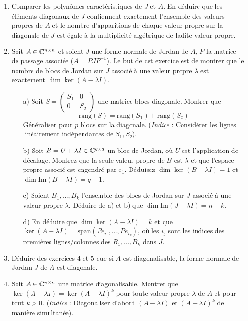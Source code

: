 \begin{enumerate}
\item Comparer les polynômes caractéristiques de $J$ et $A$. En déduire que les éléments diagonaux de $J$ contiennent exactement l'ensemble des valeurs propres de $A$ et le nombre d'apparitions de chaque valeur propre sur la diagonale de $J$ est égale à la multiplicité algébrique de ladite valeur propre.

\item Soit $A \in \Bbb C^{n \times n}$ et soient $J$ une forme normale de Jordan de $A$, $P$ la matrice de passage associée ($A = PJP^{-1}$). \newline 
Le but de cet exercice est de montrer que le nombre de blocs de Jordan sur $J$ associé à une valeur propre $\lambda$ est exactement $\dim \ker(A - \lambda I)$.
\begin{enumerate}

\item[a)] Soit $S = \begin{pmatrix} S_1 & 0 \\ 0 & S_2 \end{pmatrix}$ une matrice blocs diagonale. Montrer que $$\text{rang}(S) = \text{rang}(S_1) + \text{rang}(S_2)$$ 
Généraliser pour $p$ blocs sur la diagonale. (\textit{Indice} : Considérer les lignes linéairement indépendantes de $S_1, S_2$).
\item[b)] Soit $B = U + \lambda I \in \Bbb C^{q \times q}$ un bloc de Jordan, où $U$ est l'application de décalage. Montrez que la seule valeur propre de $B$ est $\lambda$ et que l'espace propre associé est engendré par $e_1$. Déduisez $\dim \ker (B - \lambda I) = 1$ et $\dim \text{Im} (B - \lambda I) = q-1$.
\item[c)] Soient $B_1, ..., B_k$ l'ensemble des blocs de Jordan sur $J$ associé à une valeur propre $\lambda$. Déduire de a) et b) que $\dim \text{Im} (J - \lambda I) = n - k$.
\item[d)] En déduire que $\dim \ker (A - \lambda I) = k$ et que $\ker (A - \lambda I) = \text{span}(Pe_{i_1}, ..., Pe_{i_k})$, où les $i_j$ sont les indices des premières lignes/colonnes des $B_1, ..., B_k$ dans $J$.
\end{enumerate}

\item Déduire des exercices $4$ et $5$ que si $A$ est diagonalisable, la forme normale de Jordan $J$ de $A$ est diagonale.

\item Soit $A \in \Bbb C^{n \times n}$ une matrice diagonalisable. Montrer que $\ker(A - \lambda I) = \ker(A - \lambda I)^k$ pour toute valeur propre $\lambda$ de $A$ et pour tout $k > 0$. (\textit{Indice} : Diagonaliser d'abord $(A - \lambda I)$ et $(A - \lambda I)^k$ de manière simultanée).


\end{enumerate}

